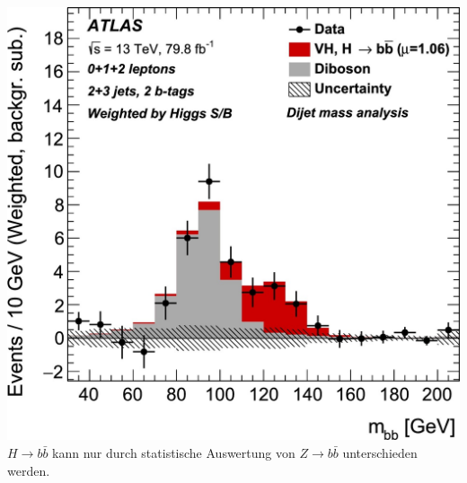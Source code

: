 \documentclass[10pt,t]{beamer}
\begin{document}
\begin{frame}
\begin{columns}
    \includegraphics[width=\textwidth]{vhbb-result} \\[1ex]
    $H\rightarrow b\bar{b}$ kann nur durch statistische Auswertung von $Z\rightarrow b\bar{b}$ unterschieden werden.
\end{columns}
\vspace*{-3pt}
\end{frame}
\end{document}
